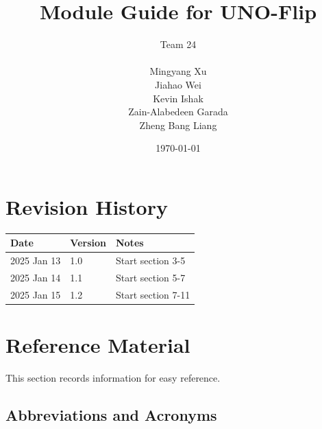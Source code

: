 \documentclass[12pt, titlepage]{article}
\begin{document}
\title{Module Guide for UNO-Flip\progname{}} 

\author{
\begin{tabular}{c}
Team 24\\
\\
Mingyang Xu \\
Jiahao Wei \\
Kevin Ishak \\
Zain-Alabedeen Garada \\
Zheng Bang Liang \\
\end{tabular}
}

\date{\today}

\maketitle


\section{Revision History}

\begin{tabularx}{\textwidth}{p{3cm}p{2cm}X}
\toprule {\bf Date} & {\bf Version} & {\bf Notes}\\
\midrule
2025 Jan 13 & 1.0 & Start section 3-5\\
2025 Jan 14 & 1.1 & Start section 5-7\\
2025 Jan 15 & 1.2 & Start section 7-11\\
\bottomrule
\end{tabularx}

\newpage

\section{Reference Material}

This section records information for easy reference.

\subsection{Abbreviations and Acronyms}
\end{document}
